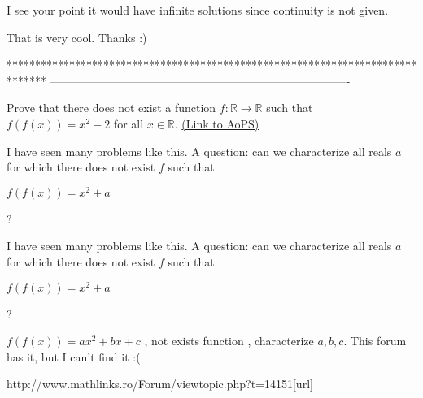 \begin{solution}
	I see your point it would have infinite solutions since continuity is not given. 

That is very cool. Thanks :)
\end{solution}
*******************************************************************************
-------------------------------------------------------------------------------

\begin{problem}
	Prove that there does not exist a function $f: \mathbb R\to\mathbb R$ such that $f(f(x))=x^2-2$ for all $x\in\mathbb R$.
	\flushright \href{https://artofproblemsolving.com/community/c6h126371}{(Link to AoPS)}
\end{problem}



\begin{solution}
	I have seen many problems like this.  A question:  can we characterize all reals $a$ for which there does not exist $f$ such that

$f(f(x)) = x^{2}+a$

?
\end{solution}



\begin{solution}
	\begin{tcolorbox}I have seen many problems like this.  A question:  can we characterize all reals $a$ for which there does not exist $f$ such that

$f(f(x)) = x^{2}+a$

?\end{tcolorbox}

$f(f(x)) = ax^{2}+bx+c$ , not exists function , characterize $a,b,c$. This forum has it, but I can't find it  :(
\end{solution}



\begin{solution}http://www.mathlinks.ro/Forum/viewtopic.php?t=14151[\/url]
\end{solution}



